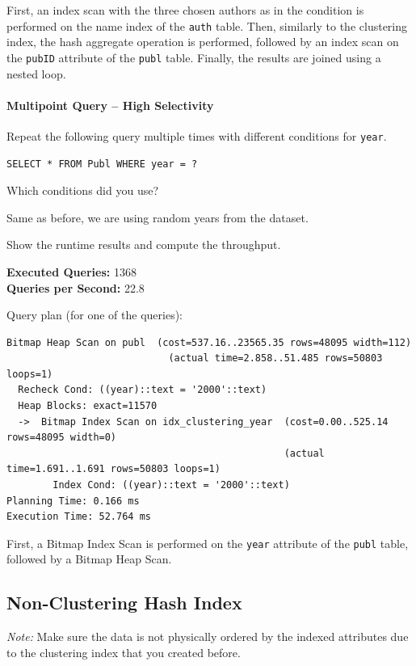 \documentclass[11pt]{scrartcl}
\begin{document}
First, an index scan with the three chosen authors as in the condition is performed on the name index of the \texttt{auth}
table.
Then, similarly to the clustering index, the hash aggregate operation is performed, followed by an index scan on the
\texttt{pubID} attribute of the \texttt{publ} table.
Finally, the results are joined using a nested loop.

\paragraph{Multipoint Query -- High Selectivity}

Repeat the following query multiple times with different conditions for \texttt{year}.

\begin{lstlisting}[style=dbtsql]
SELECT * FROM Publ WHERE year = ?
\end{lstlisting}

Which conditions did you use?

Same as before, we are using random years from the dataset.

Show the runtime results and compute the throughput.

\textbf{Executed Queries: } 1368\\
\textbf{Queries per Second: } 22.8

Query plan (for one of the queries):

{\small
\parskip0pt\begin{verbatim}
Bitmap Heap Scan on publ  (cost=537.16..23565.35 rows=48095 width=112)
                            (actual time=2.858..51.485 rows=50803 loops=1)
  Recheck Cond: ((year)::text = '2000'::text)
  Heap Blocks: exact=11570
  ->  Bitmap Index Scan on idx_clustering_year  (cost=0.00..525.14 rows=48095 width=0)
                                                (actual time=1.691..1.691 rows=50803 loops=1)
        Index Cond: ((year)::text = '2000'::text)
Planning Time: 0.166 ms
Execution Time: 52.764 ms
\end{verbatim}}

First, a Bitmap Index Scan is performed on the \texttt{year} attribute of the \texttt{publ} table, followed by a Bitmap
Heap Scan.

\subsection*{Non-Clustering Hash Index}

\emph{Note:} Make sure the data is not physically ordered by the indexed attributes due to the clustering index that you created before.
\end{document}
